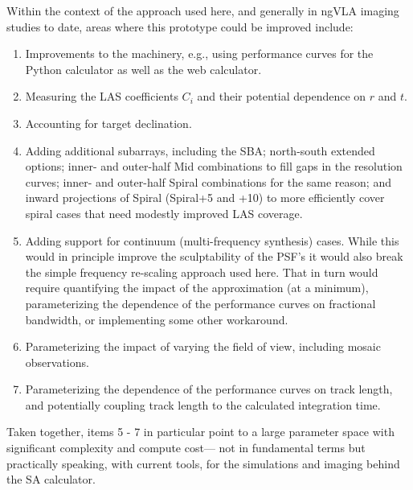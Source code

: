 \documentclass[11pt]{article}
\begin{document}
Within the context of the approach used here, and generally in ngVLA
imaging studies to date, areas where this prototype could be
improved include:
\begin{enumerate}
\item Improvements to the machinery, e.g., using performance curves
  for the Python calculator as well as the web calculator.
\item Measuring the LAS coefficients $C_i$ and their potential
  dependence on $r$ and $t$.
\item Accounting for target declination.
\item Adding additional subarrays, including the SBA; north-south extended options;
  inner- and outer-half Mid combinations to fill gaps in the resolution
  curves; inner- and outer-half Spiral combinations for the same reason;
  and inward projections of Spiral (Spiral+5 and +10) to more efficiently
  cover spiral cases that need modestly improved LAS coverage. 
\item Adding support for continuum (multi-frequency synthesis) cases.
  While this would in principle improve the sculptability of the PSF's
  it would also break the simple frequency re-scaling approach used
  here.  That in turn would require quantifying the impact of the
  approximation (at a minimum),  parameterizing the
  dependence of the performance curves on fractional bandwidth, or implementing some
  other workaround.
\item Parameterizing the impact of varying the field of view, including mosaic
  observations.    
\item Parameterizing the dependence of the performance curves on track length,
  and potentially coupling track length to the calculated integration time.
\end{enumerate}
Taken together, items 5 - 7 in particular point to a large parameter
space with significant complexity and compute cost--- not in
fundamental terms but practically speaking, with current tools, for
the simulations and imaging behind the SA calculator.
\end{document}
